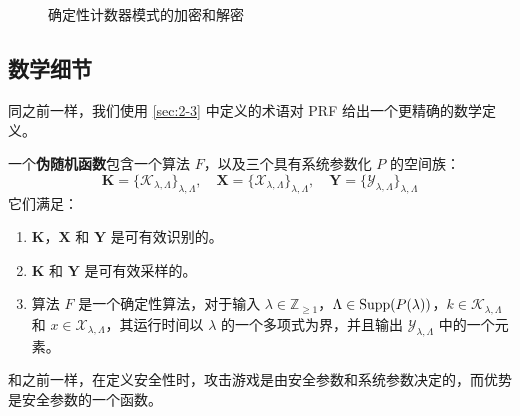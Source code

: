 \begin{figure}
  \centering
  \subfigure[加密]{}
  
  \,
  
  \,
  
  \subfigure[解密]{}
  \caption{确定性计数器模式的加密和解密}
  \label{fig:4-13}
\end{figure}

\subsection{数学细节}\label{subsec:4-4-5}

同之前一样，我们使用 \ref{sec:2-3} 中定义的术语对 PRF 给出一个更精确的数学定义。

\begin{definition}[伪随机函数]
一个\textbf{伪随机函数}包含一个算法 $F$，以及三个具有系统参数化 $P$ 的空间族：
\[
\mathbf{K}=\{\mathcal{K}_{\lambda,\Lambda}\}_{\lambda,\Lambda},\quad
\mathbf{X}=\{\mathcal{X}_{\lambda,\Lambda}\}_{\lambda,\Lambda},\quad
\mathbf{Y}=\{\mathcal{Y}_{\lambda,\Lambda}\}_{\lambda,\Lambda}
\]
它们满足：
\begin{enumerate}
	\item $\mathbf{K}$，$\mathbf{X}$ 和 $\mathbf{Y}$ 是可有效识别的。
	\item $\mathbf{K}$ 和 $\mathbf{Y}$ 是可有效采样的。
	\item 算法 $F$ 是一个确定性算法，对于输入 $\lambda\in\mathbb{Z}_{\geq1}$，$\Lambda\in{\rm Supp}(P(\lambda))$，$k\in\mathcal{K}_{\lambda,\Lambda}$ 和 $x\in\mathcal{X}_{\lambda,\Lambda}$，其运行时间以 $\lambda$ 的一个多项式为界，并且输出 $\mathcal{Y}_{\lambda,\Lambda}$ 中的一个元素。
\end{enumerate}
\end{definition}
和之前一样，在定义安全性时，攻击游戏是由安全参数和系统参数决定的，而优势是安全参数的一个函数。